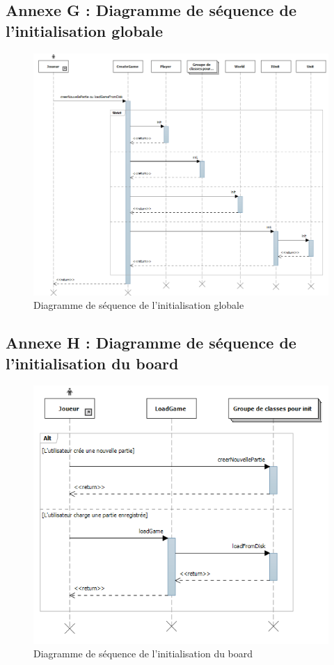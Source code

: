 \subsection{Annexe G : Diagramme de séquence de l'initialisation globale}
\begin{figure}[!h]
\centering
\includegraphics[width=1\textwidth]{img/InitAll.png}
\caption{Diagramme de séquence de l'initialisation globale}
\end{figure}
\clearpage

\subsection{Annexe H : Diagramme de séquence de l'initialisation du board}
\begin{figure}[!h]
\centering
\includegraphics[width=1\textwidth]{img/LoadInitDiagram.png}
\caption{Diagramme de séquence de l'initialisation du board}
\end{figure}
\clearpage

